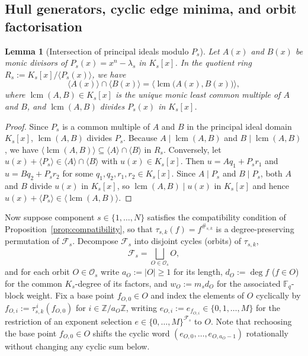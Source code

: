 \documentclass[preprint,12pt]{elsarticle}
\newcommand{\F}{\mathbb F}
\newcommand{\Z}{\mathbb Z}
\newcommand{\Fs}{\mathcal F_s}
\newcommand{\Os}{\mathcal O_s}
\newcommand{\lcm}{\operatorname{lcm}}
\numberwithin{equation}{section}
\theoremstyle{plain}
\newtheorem{lemma}[theorem]{Lemma}
\theoremstyle{definition}
\theoremstyle{remark}
\begin{document}
\subsection{Hull generators, cyclic edge minima, and orbit factorisation}\label{sec:min-formula}

\begin{lemma}[Intersection of principal ideals modulo $P_s$]\label{lem:hull-lcm}
Let $A(x)$ and $B(x)$ be monic divisors of $P_s(x)=x^n-\lambda_s$ in $K_s[x]$.
In the quotient ring $R_s:=K_s[x]/\langle P_s(x)\rangle$, we have
\[
\langle A(x)\rangle\cap\langle B(x)\rangle
 =\bigl\langle\lcm\bigl(A(x),B(x)\bigr)\bigr\rangle,
\]
where $\lcm(A,B)\in K_s[x]$ is the unique monic least common multiple of $A$ and
$B$, and $\lcm(A,B)$ divides $P_s(x)$ in $K_s[x]$.
\end{lemma}

\begin{proof}
Since $P_s$ is a common multiple of $A$ and $B$ in the principal ideal domain
$K_s[x]$, $\lcm(A,B)$ divides $P_s$. Because $A\mid\lcm(A,B)$ and
$B\mid\lcm(A,B)$, we have $\langle\lcm(A,B)\rangle\subseteq\langle A\rangle\cap
\langle B\rangle$ in $R_s$. Conversely, let $u(x)+\langle P_s\rangle\in\langle
A\rangle\cap\langle B\rangle$ with $u(x)\in K_s[x]$. Then $u=Aq_1+P_s r_1$ and
$u=Bq_2+P_s r_2$ for some $q_1,q_2,r_1,r_2\in K_s[x]$. Since $A\mid P_s$ and
$B\mid P_s$, both $A$ and $B$ divide $u(x)$ in $K_s[x]$, so $\lcm(A,B)\mid u(x)$
in $K_s[x]$ and hence $u(x)+\langle P_s\rangle\in\langle\lcm(A,B)\rangle$.
\end{proof}

Now suppose component $s\in\{1,\dots,N\}$ satisfies the compatibility condition
of Proposition~\ref{prop:compatibility}, so that $\tau_{s,k}(f)=f^{\#_{s,k}}$ is
a degree-preserving permutation of $\Fs$. Decompose $\Fs$ into disjoint cycles
(orbits) of $\tau_{s,k}$,
\[
\Fs=\bigsqcup_{O\in\Os} O,
\]
and for each orbit $O\in\Os$ write $a_O:=|O|\ge 1$ for its length, $d_O:=\deg f$
($f\in O$) for the common $K_s$-degree of its factors, and $w_O:=m_s d_O$ for the
associated $\F_q$-block weight. Fix a base point $f_{O,0}\in O$ and index the
elements of $O$ cyclically by $f_{O,i}:=\tau_{s,k}^{\,i}(f_{O,0})$ for
$i\in\Z/a_O\Z$, writing $e_{O,i}:=e_{f_{O,i}}\in\{0,1,\dots,M\}$ for the
restriction of an exponent selection $e\in\{0,\dots,M\}^{\Fs}$ to $O$. Note that
rechoosing the base point $f_{O,0}\in O$ shifts the cyclic word
$(e_{O,0},\dots,e_{O,a_O-1})$ rotationally without changing any cyclic sum below.
\end{document}
